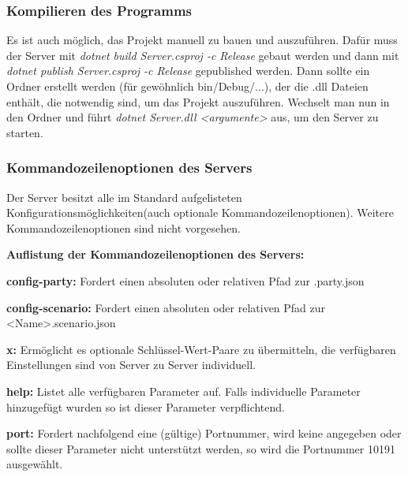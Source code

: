 \documentclass[12pt]{article}
\begin{document}
\subsubsection{Kompilieren des Programms}
Es ist auch möglich, das Projekt manuell zu bauen und auszuführen. Dafür muss der Server mit \textit{dotnet build Server.csproj -c Release} gebaut werden und dann mit \textit{dotnet publish Server.csproj -c Release} gepublished
werden. Dann sollte ein Ordner erstellt werden (für gewöhnlich bin/Debug/...), der die .dll Dateien enthält, die notwendig sind, um das Projekt auszuführen.
Wechselt man nun in den Ordner und führt \textit{dotnet Server.dll <argumente>} aus, um den Server zu starten.

\subsubsection{Kommandozeilenoptionen des Servers}
Der Server besitzt alle im Standard aufgelisteten Konfigurationsmöglichkeiten(auch optionale Kommandozeilenoptionen). Weitere Kommandozeilenoptionen sind nicht vorgesehen.

\textbf{Auflistung der Kommandozeilenoptionen des Servers:}

\textbf{config-party:} Fordert einen absoluten oder relativen Pfad zur .party.json

\textbf{config-scenario:} Fordert einen absoluten oder relativen Pfad zur <Name>.scenario.json

\textbf{x:} Ermöglicht es optionale Schlüssel-Wert-Paare zu übermitteln, die verfügbaren Einstellungen sind von
Server zu Server individuell.

\textbf{help:} Listet alle verfügbaren Parameter auf. Falls individuelle Parameter hinzugefügt wurden so ist dieser Parameter verpflichtend.

\textbf{port:} Fordert nachfolgend eine (gültige) Portnummer, wird keine angegeben oder sollte dieser Parameter
nicht unterstützt werden, so wird die Portnummer 10191 ausgewählt.
\end{document}
